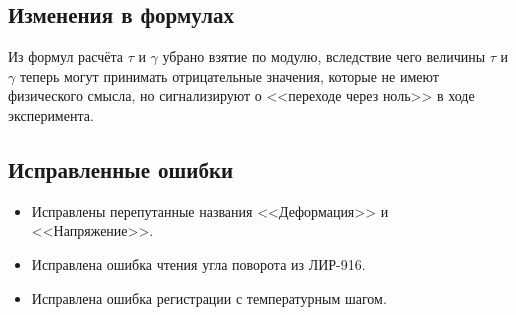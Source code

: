 \documentclass[12pt, a4paper]{article}
\newcommand{\ITEM}[1]{\subsection*{#1}}
\newcommand{\FIXEDERRORS}{\subsection*{Исправленные ошибки}}
\begin{document}
\ITEM{Изменения в формулах}

Из формул расчёта $\tau$ и $\gamma$ убрано взятие по модулю, вследствие чего величины $\tau$ и $\gamma$ теперь могут принимать отрицательные значения, которые не имеют физического смысла, но сигнализируют о <<переходе через ноль>> в ходе эксперимента.

\FIXEDERRORS

\begin{itemize}
\item Исправлены перепутанные названия <<Деформация>> и <<Напряжение>>.
\item Исправлена ошибка чтения угла поворота из ЛИР-916.
\item Исправлена ошибка регистрации с температурным шагом.
\end{itemize}
\end{document}
